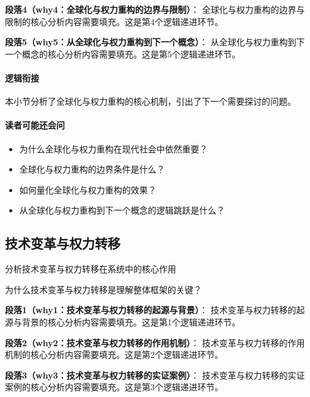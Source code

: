 \documentclass[../main.tex]{subfiles}
\begin{document}
\textbf{段落4（why4：全球化与权力重构的边界与限制）}：
全球化与权力重构的边界与限制的核心分析内容需要填充。这是第4个逻辑递进环节。


\textbf{段落5（why5：从全球化与权力重构到下一个概念）}：
从全球化与权力重构到下一个概念的核心分析内容需要填充。这是第5个逻辑递进环节。


\paragraph*{逻辑衔接}
本小节分析了全球化与权力重构的核心机制，引出了下一个需要探讨的问题。

\paragraph*{读者可能还会问}
\begin{itemize}
\item 为什么全球化与权力重构在现代社会中依然重要？
\item 全球化与权力重构的边界条件是什么？
\item 如何量化全球化与权力重构的效果？
\item 从全球化与权力重构到下一个概念的逻辑跳跃是什么？
\end{itemize}


\subsection{技术变革与权力转移}

\begin{motivation}
分析技术变革与权力转移在系统中的核心作用
\end{motivation}

\begin{logicmap}
[逻辑链占位]
\end{logicmap}

\begin{questionbox}
为什么技术变革与权力转移是理解整体框架的关键？
\end{questionbox}

\textbf{段落1（why1：技术变革与权力转移的起源与背景）}：
技术变革与权力转移的起源与背景的核心分析内容需要填充。这是第1个逻辑递进环节。


\textbf{段落2（why2：技术变革与权力转移的作用机制）}：
技术变革与权力转移的作用机制的核心分析内容需要填充。这是第2个逻辑递进环节。


\textbf{段落3（why3：技术变革与权力转移的实证案例）}：
技术变革与权力转移的实证案例的核心分析内容需要填充。这是第3个逻辑递进环节。
\end{document}
